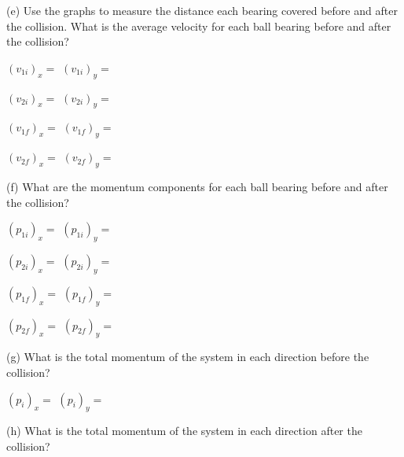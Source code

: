 
(e) Use the graphs to measure the distance each bearing covered before and after
the collision. What is the average velocity for each ball bearing before and
after the collision?
\vspace{7mm}

\( (v_{1i})_{x}= \) \hfill{}\( (v_{1i})_{y}= \)  \hfill{}
\vspace{7mm}

\( (v_{2i})_{x} =\)  \hfill{}\( (v_{2i})_{y}= \)  \hfill{}
\vspace{7mm}

\( (v_{1f})_{x} =\)  \hfill{}\( (v_{1f})_{y}= \)  \hfill{}
\vspace{7mm}

\((v_{2f})_{x} =\)  \hfill{}\( (v_{2f})_{y}= \)  \hfill{}
\vspace{7mm}


(f) What are the momentum components for each ball bearing before and after
the collision?
\vspace{7mm}

\( (p_{1i})_{x}= \) \hfill{}\( (p_{1i})_{y}= \)  \hfill{}
\vspace{7mm}

\( (p_{2i})_{x} =\)  \hfill{}\( (p_{2i})_{y}= \)  \hfill{}
\vspace{7mm}

\( (p_{1f})_{x} =\)  \hfill{}\( (p_{1f})_{y}= \)  \hfill{}
\vspace{7mm}

\((p_{2f})_{x} =\)  \hfill{}\( (p_{2f})_{y}= \)  \hfill{}
\vspace{7mm}


(g) What is the total momentum of the system in each direction before the 
collision?
\vspace{7mm}

\( (p_{i})_{x} =\)  \hfill{}\( (p_{i})_{y}= \) \hfill{} 
\vspace{7mm}

(h) What is the total momentum of the system in each direction after the 
collision?
\vspace{7mm}

